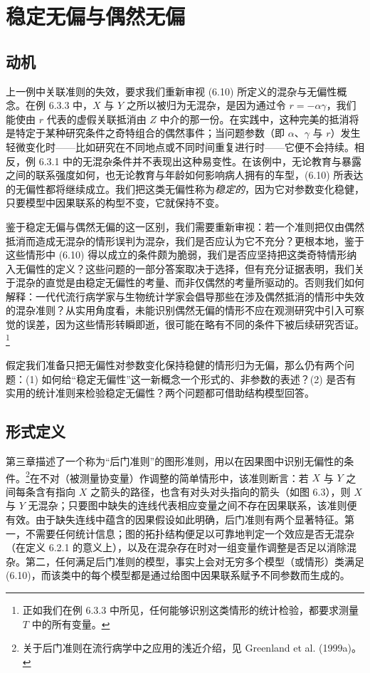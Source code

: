 
\section{稳定无偏与偶然无偏}

\subsection{动机}

上一例中关联准则的失效，要求我们重新审视 \textup{(6.10)} 所定义的混杂与无偏性概念。在例 6.3.3 中，$X$ 与 $Y$ 之所以被归为无混杂，是因为通过令 $r=-\alpha\gamma$，我们能使由 $r$ 代表的虚假关联抵消由 $Z$ 中介的那一份。在实践中，这种完美的抵消将是特定于某种研究条件之奇特组合的偶然事件；当问题参数（即 $\alpha$、$\gamma$ 与 $r$）发生轻微变化时——比如研究在不同地点或不同时间重复进行时——它便不会持续。相反，例 6.3.1 中的无混杂条件并不表现出这种易变性。在该例中，无论教育与暴露之间的联系强度如何，也无论教育与年龄如何影响病人拥有的车型，\textup{(6.10)} 所表达的无偏性都将继续成立。我们把这类无偏性称为\emph{稳定的}，因为它对参数变化稳健，只要模型中因果联系的构型不变，它就保持不变。

鉴于稳定无偏与偶然无偏的这一区别，我们需要重新审视：若一个准则把仅由偶然抵消而造成无混杂的情形误判为混杂，我们是否应认为它不充分？更根本地，鉴于这些情形中 \textup{(6.10)} 得以成立的条件颇为脆弱，我们是否应坚持把这类奇特情形纳入无偏性的定义？这些问题的一部分答案取决于选择，但有充分证据表明，我们关于混杂的直觉是由稳定无偏性的考量、而非仅偶然的考量所驱动的。否则我们如何解释：一代代流行病学家与生物统计学家会倡导那些在涉及偶然抵消的情形中失效的混杂准则？从实用角度看，未能识别偶然无偏的情形不应在观测研究中引入可察觉的误差，因为这些情形转瞬即逝，很可能在略有不同的条件下被后续研究否证。\footnote{正如我们在例 6.3.3 中所见，任何能够识别这类情形的统计检验，都要求测量 $T$ 中的所有变量。}

假定我们准备只把无偏性对参数变化保持稳健的情形归为无偏，那么仍有两个问题：(1) 如何给“稳定无偏性”这一新概念一个形式的、非参数的表述？(2) 是否有实用的统计准则来检验稳定无偏性？两个问题都可借助结构模型回答。

\subsection{形式定义}

第三章描述了一个称为“后门准则”的图形准则，用以在因果图中识别无偏性的条件。\footnote{关于后门准则在流行病学中之应用的浅近介绍，见 Greenland et al. (1999a)。}在不对（被测量协变量）作调整的简单情形中，该准则断言：若 $X$ 与 $Y$ 之间每条含有指向 $X$ 之箭头的路径，也含有对头对头指向的箭头（如图 6.3），则 $X$ 与 $Y$ 无混杂；只要图中缺失的连线代表相应变量之间不存在因果联系，该准则便有效。由于缺失连线中蕴含的因果假设如此明确，后门准则有两个显著特征。第一，不需要任何统计信息；图的拓扑结构便足以可靠地判定一个效应是否无混杂（在定义 6.2.1 的意义上），以及在混杂存在时对一组变量作调整是否足以消除混杂。第二，任何满足后门准则的模型，事实上会对无穷多个模型（或情形）类满足 \textup{(6.10)}，而该类中的每个模型都是通过给图中因果联系赋予不同参数而生成的。

